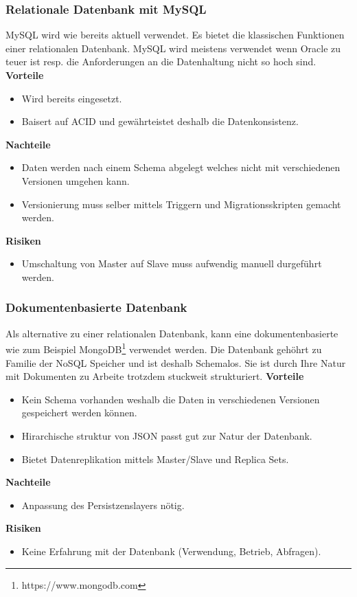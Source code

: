 \subsubsection{Relationale Datenbank mit MySQL}

MySQL wird wie bereits aktuell verwendet. Es bietet die klassischen Funktionen einer relationalen Datenbank. MySQL wird meistens verwendet wenn Oracle zu teuer ist resp. die Anforderungen an die Datenhaltung nicht so hoch sind.
\newline
\newline
\textbf{Vorteile}
\begin{itemize}
	\item Wird bereits eingesetzt.
	\item Baisert auf \gls{ACID} und gewährteistet deshalb die Datenkonsistenz.
\end{itemize}
\textbf{Nachteile}
\begin{itemize}
	\item Daten werden nach einem Schema abgelegt welches nicht mit verschiedenen Versionen umgehen kann.
	\item Versionierung muss selber mittels Triggern und Migrationsskripten gemacht werden.
\end{itemize}
\textbf{Risiken}
\begin{itemize}
	\item Umschaltung von Master auf Slave muss aufwendig manuell durgeführt werden.
\end{itemize}

\subsubsection{Dokumentenbasierte Datenbank}

Als alternative zu einer relationalen Datenbank, kann eine dokumentenbasierte wie zum Beispiel MongoDB\footnote{https://www.mongodb.com} verwendet werden. Die Datenbank gehöhrt zu Familie der \Gls{NoSQL} Speicher und ist deshalb Schemalos. Sie ist durch Ihre Natur mit Dokumenten zu Arbeite trotzdem stuckweit strukturiert. 
\newline
\newline
\textbf{Vorteile}
\begin{itemize}
	\item Kein Schema vorhanden weshalb die Daten in verschiedenen Versionen gespeichert werden können.
	\item Hirarchische struktur von JSON passt gut zur Natur der Datenbank.
	\item Bietet Datenreplikation mittels Master/Slave und Replica Sets.
\end{itemize}
\textbf{Nachteile}
\begin{itemize}
	\item Anpassung des Persistzenslayers nötig.
\end{itemize}
\textbf{Risiken}
\begin{itemize}
	\item Keine Erfahrung mit der Datenbank (Verwendung, Betrieb, Abfragen).
\end{itemize}

